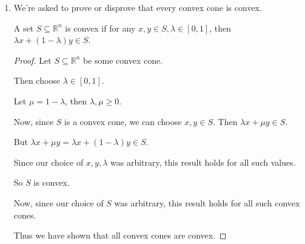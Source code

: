 \documentclass[12pt,letterpaper]{article}
\begin{document}
\begin{enumerate}
\begin{enumerate}
          \begin{proof}
            Let $C = \{x \in \mathbb{R}^n | Ax = b\}$,
            where $A \in \mathbb{R}^{m \times n}, b \in \mathbb{R}^m$, be a convex polyhedron.

            Then choose some arbitrary $x, y \in C$ and $\lambda, \mu > 0 \in \mathbb{R}$.

            Now $A \left(\lambda x + \mu y\right) = A \lambda x + A \mu y = \lambda A x + \mu A y = \lambda b + \mu b = \left(\lambda + \mu \right) b > b$.

            So $\lambda x + \mu y \notin C$.

            Since we chose arbitrary $x, y, \lambda, \mu$, and $\lambda x + \mu y \notin C$,
            $C$ is not a convex cone.

            Then there is at least one convex polyhedron that is not a convex cone.

            Thus, we have disproved that every convex polyhedron is a convex cone.
          \end{proof}
        \item
          We're asked to prove or disprove that every convex cone is convex.

          A set $S \subseteq \mathbb{R}^n$ is convex
          if for any $x, y \in S, \lambda \in \left[0, 1\right]$,
          then $\lambda x + \left(1 - \lambda\right) y \in S$.

          \begin{proof}
            Let $S \subseteq \mathbb{R}^n$ be some convex cone.

            Then choose $\lambda \in \left[0, 1\right]$.

            Let $\mu = 1 - \lambda$, then $\lambda, \mu \geq 0$.

            Now, since $S$ is a convex cone, we can choose $x, y \in S$.
            Then $\lambda x + \mu y \in S$.

            But $\lambda x + \mu y = \lambda x + \left(1 - \lambda\right) y \in S$.

            Since our choice of $x, y, \lambda$ was arbitrary,
            this result holds for all such values.

            So $S$ is convex.

            Now, since our choice of $S$ was arbitrary,
            this result holds for all such convex cones.

            Thus we have shown that all convex cones are convex.
          \end{proof}
      \end{enumerate}
  \end{enumerate}
\end{document}
